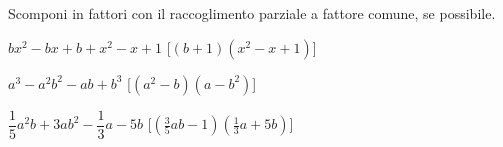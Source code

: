 \begin{esercizio}[\Ast]
\label{ese:div.015}
Scomponi in fattori con il raccoglimento parziale a fattore comune, se possibile.
\begin{enumeratea}
 \item $bx^{2}-bx+b+x^{2}-x+1$ 
  \hfill [$(b+1)(x^{2}-x+1)$]
 \item $a^{3}-a^{2}b^{2}-ab+b^{3}$ 
  \hfill [$\left(a^{2}-b\right)\left(a-b^{2}\right)$]
 \item $\dfrac{1}{5}a^{2}b+3ab^{2}-\dfrac{1}{3}a-5b$ 
  \hfill [$\left(\frac{3}{5}ab-1\right)\left(\frac{1}{3}a+5b\right)$]
\end{enumeratea}
\end{esercizio}
% 
% 
% 
